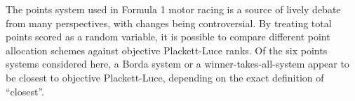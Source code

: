 \documentclass[a4,12pt]{article}
\begin{document}
The points system used in Formula 1 motor racing is a source of lively
debate from many perspectives, with changes being controversial.  By
treating total points scored as a random variable, it is possible to
compare different point allocation schemes against objective
Plackett-Luce ranks.  Of the six points systems considered here, a
Borda system or a winner-takes-all-system appear to be closest to
objective Plackett-Luce, depending on the exact definition of
``closest''.





\end{document}
